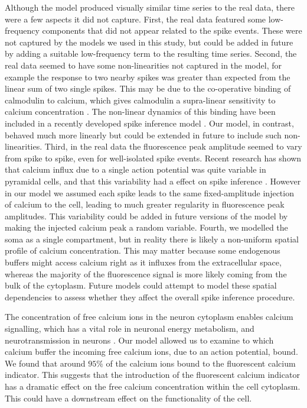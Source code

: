 Although the model produced visually similar time series to the real data, there were a few aspects it did not capture. First, the real data featured some low-frequency components that did not appear related to the spike events. These were not captured by the models we used in this study, but could be added in future by adding a suitable low-frequency term to the resulting time series. Second, the real data seemed to have some non-linearities not captured in the model, for example the response to two nearby spikes was greater than expected from the linear sum of two single spikes. This may be due to the co-operative binding of calmodulin to calcium, which gives calmodulin a supra-linear sensitivity to calcium concentration \parencite{faas}. The non-linear dynamics of this binding have been included in a recently developed spike inference model \parencite{greenberg}. Our model, in contrast, behaved much more linearly but could be extended in future to include such non-linearities. Third, in the real data the fluorescence peak amplitude seemed to vary from spike to spike, even for well-isolated spike events. Recent research has shown that calcium influx due to a single action potential was quite variable in pyramidal cells, and that this variability had a effect on spike inference \parencite{eltes}. However in our model we assumed each spike leads to the same fixed-amplitude injection of calcium to the cell, leading to much greater regularity in fluorescence peak amplitudes. This variability could be added in future versions of the model by making the injected calcium peak a random variable. Fourth, we modelled the soma as a single compartment, but in reality there is likely a non-uniform spatial profile of calcium concentration. This may matter because some endogenous buffers might access calcium right as it influxes from the extracellular space, whereas the majority of the fluorescence signal is more likely coming from the bulk of the cytoplasm. Future models could attempt to model these spatial dependencies to assess whether they affect the overall spike inference procedure.

The concentration of free calcium ions in the neuron cytoplasm enables calcium signalling, which has a vital role in neuronal energy metabolism, and neurotransmission in neurons \parencite{brini}. Our model allowed us to examine to which calcium buffer the incoming free calcium ions, due to an action potential, bound. We found that around $95\%$ of the calcium ions bound to the fluorescent calcium indicator. This suggests that the introduction of the fluorescent calcium indicator has a dramatic effect on the free calcium concentration within the cell cytoplasm. This could have a downstream effect on the functionality of the cell.

